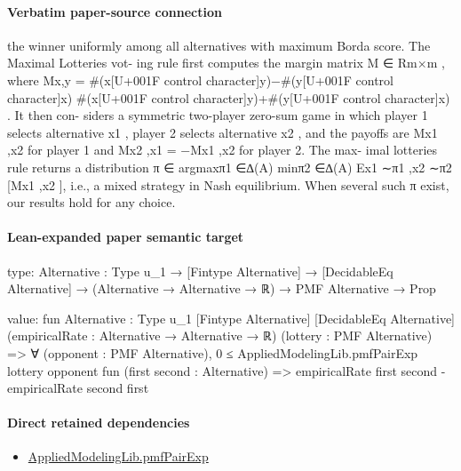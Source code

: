 \documentclass[10pt]{article}
\begin{document}
\paragraph{Verbatim paper-source connection}
\begin{ReviewVerbatim}
the winner uniformly among all alternatives with maximum Borda score. The Maximal Lotteries vot-
ing rule first computes the margin matrix M ∈ Rm×m , where Mx,y = #(x[U+001F control character]y)−#(y[U+001F control character]x)
                                                                          #(x[U+001F control character]y)+#(y[U+001F control character]x) . It then con-
siders a symmetric two-player zero-sum game in which player 1 selects alternative x1 , player 2 selects
alternative x2 , and the payoffs are Mx1 ,x2 for player 1 and Mx2 ,x1 = −Mx1 ,x2 for player 2. The max-
imal lotteries rule returns a distribution π ∈ argmaxπ1 ∈∆(A) minπ2 ∈∆(A) Ex1 ∼π1 ,x2 ∼π2 [Mx1 ,x2 ],
i.e., a mixed strategy in Nash equilibrium. When several such π exist, our results hold for any choice.
\end{ReviewVerbatim}



\paragraph{Lean-expanded paper semantic target}
\begin{ReviewVerbatim}
type:
{Alternative : Type u_1} →
  [Fintype Alternative] → [DecidableEq Alternative] → (Alternative → Alternative → ℝ) → PMF Alternative → Prop

value:
fun {Alternative : Type u_1} [Fintype Alternative] [DecidableEq Alternative]
    (empiricalRate : Alternative → Alternative → ℝ) (lottery : PMF Alternative) =>
  ∀ (opponent : PMF Alternative),
    0 ≤
      AppliedModelingLib.pmfPairExp lottery opponent fun (first second : Alternative) =>
        empiricalRate first second - empiricalRate second first
\end{ReviewVerbatim}

\paragraph{Direct retained dependencies}
\begin{itemize}\raggedright
\item \hyperlink{governing-declaration-09677001d465ec9d}{Applied\allowbreak{}Modeling\allowbreak{}Lib.\allowbreak{}pmf\allowbreak{}Pair\allowbreak{}Exp}
\end{itemize}
\end{document}
